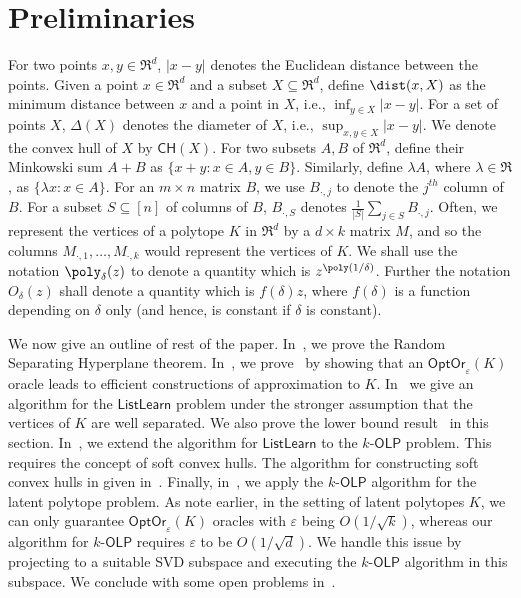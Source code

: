 \documentclass[11pt,letterpaper]{article}
\newcommand{\ch}{{\mathsf{CH}}}
\newcommand{\dia}{\Delta}
\newcommand{\olp}{{\mathsf {OLP}}\xspace}
\newcommand{\kolp}{k\mbox{-}\olp}
\newcommand{\ListLearn}{\mathsf {ListLearn}\xspace}
\newcommand{\Mdot}[1]{{M_{\cdot, #1}}}
\newcommand{\opto}{{\mathsf{OptOr}}}
\begin{document}
\section{Preliminaries}
 For two points $x, y \in \Re^d$, $|x-y|$ denotes the Euclidean distance between the points. Given a point $x \in \Re^d$ and a subset $X \subseteq \Re^d$, define $\dist(x, X)$ as the minimum distance between $x$ and a point in $X$, i.e., $\inf_{y \in X} |x-y|$. 
For a set of points $X$, $\dia(X)$ denotes the diameter of $X$, i.e., $\sup_{x, y \in X} |x-y|$. We  denote the convex hull of $X$ by $\ch(X)$. For two subsets $A, B$ of $\Re^d$, define their Minkowski sum $A+B$ as $\{x+y: x \in A, y \in B\}$. Similarly, define $\lambda A$, where $\lambda \in \Re$, as $\{ \lambda x: x \in A\}$.
For an $m \times n$ matrix $B$, we use $B_{\cdot, j}$ to denote the $j^{th}$ column of $B$. For a subset $S \subseteq [n]$ of columns of $B$, $B_{\cdot, S}$  denotes $\frac{1}{|S|} \sum_{j \in S} B_{\cdot, j}$. Often, we represent the vertices of a polytope $K$ in $\Re^d$ by a $d \times k$ matrix $M$, and so the columns $\Mdot{1}, \ldots, \Mdot{k}$ would represent the vertices of $K$. We shall use the notation $\poly_\delta(z)$ to denote a quantity which is $z^{\poly(1/\delta)}$. Further the notation $O_\delta(z)$ shall denote a quantity which is $f(\delta) z$, where $f(\delta)$ is a function depending on $\delta$ only (and hence, is constant if $\delta$ is constant). 

We now give an outline of rest of the paper. In~, we prove the Random Separating Hyperplane theorem.  In~, we prove~ by showing that an $\opto_\varepsilon(K)$ oracle leads to efficient constructions of approximation to $K$. In~ we give an algorithm for the $\ListLearn$ problem under the stronger assumption that the vertices of $K$ are well separated. We also prove the lower bound result~ in this section. In~, we extend the algorithm for $\ListLearn$ to the $\kolp$ problem. This requires the concept of soft convex hulls. The algorithm for constructing soft convex hulls in given in~. Finally, in~, we apply the $\kolp$ algorithm for the latent polytope problem. As note earlier, in the setting of latent polytopes $K$, we can only guarantee $\opto_\varepsilon(K)$ oracles with $\varepsilon$ being $O(1/\sqrt{k})$, whereas our algorithm for $\kolp$ requires $\varepsilon$ to be $O(1/\sqrt{d})$. We handle this issue by projecting to a suitable SVD subspace and executing the $\kolp$ algorithm in this subspace. We conclude with some open problems in~.
\end{document}
